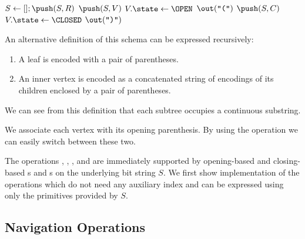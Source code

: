 \begin{algorithmic}
	\State $S \gets []; \push(S, R)$ 
		 
			\State $\push(S, V)$ 
			\State $V.\state \gets \OPEN$
			\State $\out(\openingParen)$
				\State $\push(S, C)$
			\EndFor
		 
			\State $V.\state \gets \CLOSED$
			\State $\out(\closingParen)$
		\EndIf
	\EndWhile
\EndFunction
\end{algorithmic}

An alternative definition of this schema can be expressed recursively:
\begin{enumerate}
	\item A leaf is encoded with a pair of parentheses.
	\item An inner vertex is encoded as a concatenated string of encodings of its children enclosed by a pair of parentheses.
\end{enumerate}
We can see from this definition that each subtree occupies a continuous substring.

\bigbreak

We associate each vertex with its opening parenthesis.
By using the operation \match{} we can easily switch between these two.

The operations \preRank{}, \preSelect{}, \postRank{}, and \postSelect{} are immediately supported by opening-based and closing-based \rank{}s and \select{}s on the underlying bit string $S$.
We first show implementation of the operations which do not need any auxiliary index and can be expressed using only the primitives provided by $S$.

\begin{algorithmic}
	\State {}
\EndFunction
\end{algorithmic}

\begin{algorithmic}
	\State {} 
\EndFunction
\end{algorithmic}

\subsection{Navigation Operations}

